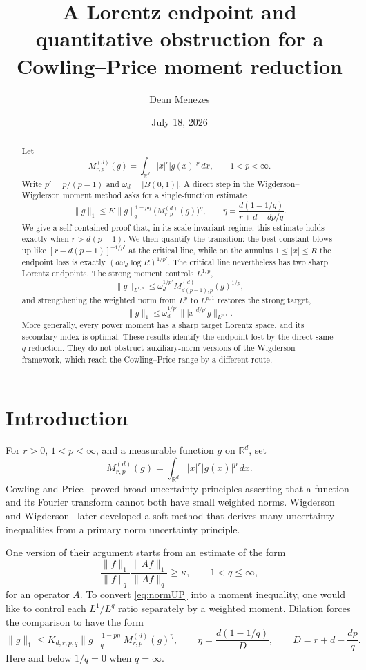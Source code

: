 \documentclass[11pt]{amsart}
\date{July 18, 2026}
\title{A Lorentz endpoint and quantitative obstruction
for a Cowling--Price moment reduction}
\author{Dean Menezes}
\theoremstyle{remark}
\newcommand{\R}{\mathbb R}
\newcommand{\norm}[1]{\lVert #1\rVert}
\newcommand{\Mrp}{M_{r,p}^{(d)}}
\renewcommand{\Mc}{M_{d(p-1),p}^{(d)}}
\begin{document}
\maketitle

\begin{abstract}
Let
\[
 M_{r,p}^{(d)}(g)=\int_{\R^d}|x|^r|g(x)|^p\,dx,
 \qquad 1<p<\infty.
\]
Write $p'=p/(p-1)$ and $\omega_d=|B(0,1)|$.  A direct step in the
Wigderson--Wigderson moment method asks for a
single-function estimate
\[
 \norm{g}_1\le K\norm{g}_q^{\,1-p\eta}
 \bigl(M_{r,p}^{(d)}(g)\bigr)^\eta,
 \qquad
 \eta=\frac{d(1-1/q)}{r+d-dp/q}.
\]
We give a self-contained proof that, in its scale-invariant regime, this
estimate holds exactly when $r>d(p-1)$.  We then quantify the transition:
the best constant blows up like
$[r-d(p-1)]^{-1/p'}$ at the critical line, while on the annulus
$1\le |x|\le R$ the endpoint loss is exactly
$(d\omega_d\log R)^{1/p'}$.  The critical line nevertheless has two
sharp Lorentz endpoints.  The strong moment controls $L^{1,p}$,
\[
 \norm{g}_{L^{1,p}}\le \omega_d^{1/p'}\Mc(g)^{1/p},
\]
and strengthening the weighted norm from $L^p$ to $L^{p,1}$ restores the
strong target,
\[
 \norm{g}_1\le \omega_d^{1/p'}
 \norm{|x|^{d/p'}g}_{L^{p,1}}.
\]
More generally, every power moment has a sharp target Lorentz space, and
its secondary index is optimal.  These results identify the endpoint lost
by the direct same-$q$ reduction.  They do not obstruct auxiliary-norm
versions of the Wigderson framework, which reach the Cowling--Price range
by a different route.
\end{abstract}

\section{Introduction}

For $r>0$, $1<p<\infty$, and a measurable function $g$ on $\R^d$, set
\begin{equation}\label{eq:moment}
 \Mrp(g)=\int_{\R^d}|x|^r|g(x)|^p\,dx.
\end{equation}
Cowling and Price~\cite{CP84} proved broad uncertainty principles asserting
that a function and its Fourier transform cannot both have small weighted
norms.  Wigderson and Wigderson~\cite{WW21} later developed a soft method
that derives many uncertainty inequalities from a primary norm uncertainty
principle.

One version of their argument starts from an estimate of the form
\begin{equation}\label{eq:normUP}
 \frac{\norm{f}_1}{\norm{f}_q}
 \frac{\norm{Af}_1}{\norm{Af}_q}\ge \kappa,
 \qquad 1<q\le\infty,
\end{equation}
for an operator $A$.  To convert \eqref{eq:normUP} into a moment inequality,
one would like to control each $L^1/L^q$ ratio separately by a weighted
moment.  Dilation forces the comparison to have the form
\begin{equation}\label{eq:direct}
 \norm{g}_1
 \le K_{d,r,p,q}\norm{g}_q^{\,1-p\eta}\Mrp(g)^\eta,
 \qquad
 \eta=\frac{d(1-1/q)}{D},
 \qquad
 D=r+d-\frac{dp}{q}.
\end{equation}
Here and below $1/q=0$ when $q=\infty$.
\end{document}
